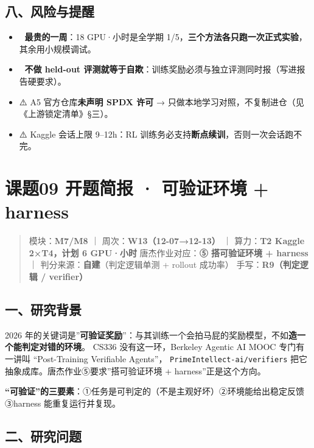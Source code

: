 \documentclass[
  chinese,
  11pt,
]{ctexart}
\providecommand{\tightlist}{%
  \setlength{\itemsep}{0pt}\setlength{\parskip}{0pt}}
\begin{document}
\subsection{八、风险与提醒}\label{ux516bux98ceux9669ux4e0eux63d0ux9192-6}

\begin{itemize}
\tightlist
\item
  🚨 \textbf{最贵的一周}：18 GPU·小时是全学期 1/5，\textbf{三个方法各只跑一次正式实验}，其余用小规模调试。
\item
  🚨 \textbf{不做 held-out 评测就等于自欺}：训练奖励必须与独立评测同时报（写进报告硬要求）。
\item
  ⚠️ A5 官方仓库\textbf{未声明 SPDX 许可} → 只做本地学习对照，不复制进仓（见《上游锁定清单》§三）。
\item
  ⚠️ Kaggle 会话上限 9--12h：RL 训练务必支持\textbf{断点续训}，否则一次会话跑不完。
\end{itemize}

\newpage

\section{课题09 开题简报 · 可验证环境 + harness}\label{ux8bfeux989809-ux5f00ux9898ux7b80ux62a5-ux53efux9a8cux8bc1ux73afux5883-harness}

\begin{quote}
模块：\textbf{M7/M8} ｜ 周次：\textbf{W13（12-07→12-13）} ｜ 算力：\textbf{T2 Kaggle 2×T4，计划 6 GPU·小时} 唐杰作业对应：\textbf{⑤ 搭可验证环境 + harness} ｜ 判分来源：\textbf{自建}（判定逻辑单测 + rollout 成功率） 手写：\textbf{R9（判定逻辑 / verifier）}
\end{quote}

\subsection{一、研究背景}\label{ux4e00ux7814ux7a76ux80ccux666f-7}

2026 年的关键词是''\textbf{可验证奖励}''：与其训练一个会拍马屁的奖励模型，不如\textbf{造一个能判定对错的环境}。 CS336 没有这一环，Berkeley Agentic AI MOOC 专门有一讲叫 ``Post-Training Verifiable Agents''， \texttt{PrimeIntellect-ai/verifiers} 把它抽象成库。唐杰作业⑤要求''搭可验证环境 + harness''正是这个方向。

\textbf{``可验证''的三要素}：①任务是可判定的（不是主观好坏）②环境能给出稳定反馈 ③harness 能重复运行并复现。

\subsection{二、研究问题}\label{ux4e8cux7814ux7a76ux95eeux9898-3}
\end{document}
